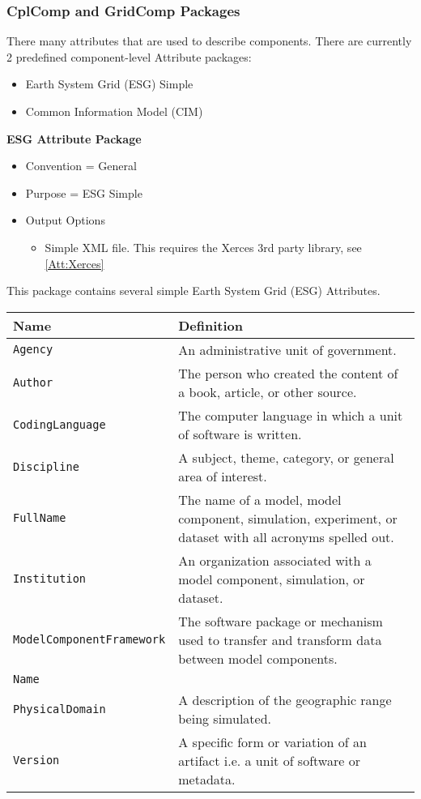 \subsubsection{CplComp and GridComp Packages}
\label{ComponentAttributePackages}

There many attributes that are used to describe components. There are currently 2 predefined component-level Attribute packages:

\begin{itemize}
    \item Earth System Grid (ESG) Simple
    \item Common Information Model (CIM) 
\end{itemize}


{\bf ESG Attribute Package}

\begin{itemize}
    \item Convention = General
    \item Purpose = ESG Simple
    \item Output Options
    \begin{itemize}
        \item{Simple XML file. This requires the Xerces 3rd party library, see \ref{Att:Xerces}}
    \end{itemize}  
\end{itemize}

This package contains several simple Earth System Grid (ESG) Attributes. 

\begin{tabular}{|p{8cm}|p{20cm}|}
     \hline\hline
     {\bf Name} & {\bf Definition} \\
     \hline\hline
     {\tt Agency} & An administrative unit of government.\\
     {\tt Author} & The person who created the content of a book, article, or other source.\\
     {\tt CodingLanguage} & The computer language in which a unit of software is written. \\
     {\tt Discipline} & A subject, theme, category, or general area of interest.\\
     {\tt FullName} & The name of a model, model component, simulation, experiment, or dataset with all acronyms spelled out.\\
     {\tt Institution} & An organization associated with a model component, simulation, or dataset.\\
     {\tt ModelComponentFramework} & The software package or mechanism used to transfer and transform data between model components. \\
     {\tt Name} & \\
     {\tt PhysicalDomain} & A description of the geographic range being simulated.\\
     {\tt Version} & A specific form or variation of an artifact i.e. a unit of software or metadata.\\ 
\end{tabular}

